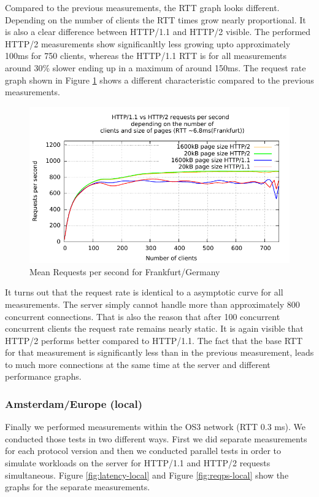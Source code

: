 Compared to the previous measurements, the RTT graph looks different. Depending on the number of clients the RTT times grow nearly proportional. It is also a clear difference between HTTP/1.1 and HTTP/2 visible. The performed HTTP/2 measurements show significanltly less growing upto approximately 100ms for 750 clients, whereas the HTTP/1.1 RTT is for all measurements around 30\% slower ending up in a maximum of around 150ms. The  request rate graph shown in Figure \ref{fig:reqps-frankfurt} shows a different characteristic compared to the previous measurements.

\begin{figure}[H]
	\centering
	\includegraphics[scale=1,trim=0.0cm .0cm .0cm .0cm,clip]{images/reqps-frankfurt.pdf}
	\caption{Mean Requests per second for Frankfurt/Germany}
	\label{fig:reqps-frankfurt}
\end{figure}

It turns out that the request rate is identical to a asymptotic curve for all measurements. The server simply cannot handle more than approximately 800 concurrent connections. That is also the reason that after 100 concurrent concurrent clients the request rate remains nearly static. It is again visible that HTTP/2 performs better compared to HTTP/1.1. The fact that the base RTT for that measurement is significantly less than in the previous measurement, leads to much more connections at the same time at the server and different performance graphs.

\subsubsection{Amsterdam/Europe (local)}

Finally we performed measurements within the OS3 network (RTT 0.3 ms). We conducted those tests in two different ways. First we did separate measurements for each protocol version and then we conducted parallel tests in order to simulate workloads on the server for HTTP/1.1 and HTTP/2 requests simultaneous. Figure \ref{fig:latency-local} and Figure \ref{fig:reqps-local} show the graphs for the separate measurements.


